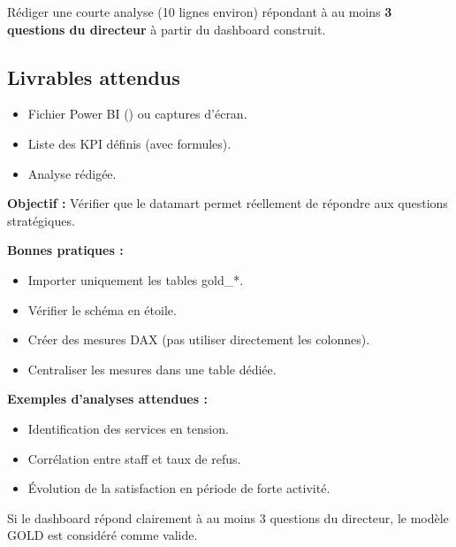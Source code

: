 \documentclass[11pt,a4paper]{article}
\begin{document}
Rédiger une courte analyse (10 lignes environ) répondant à au moins
\textbf{3 questions du directeur} à partir du dashboard construit.

\subsection*{Livrables attendus}

\begin{itemize}
  \item Fichier Power BI () ou captures d’écran.
  \item Liste des KPI définis (avec formules).
  \item Analyse rédigée.
\end{itemize}

\begin{tcolorbox}[title=\textbf{Validation décisionnelle via Power BI :}, colback=gray!5, colframe=black, boxrule=0.8pt, arc=2mm]

\textbf{Objectif :}
Vérifier que le datamart permet réellement de répondre
aux questions stratégiques.

\textbf{Bonnes pratiques :}
\begin{itemize}
\item Importer uniquement les tables gold\_*.
\item Vérifier le schéma en étoile.
\item Créer des mesures DAX (pas utiliser directement les colonnes).
\item Centraliser les mesures dans une table dédiée.
\end{itemize}

\textbf{Exemples d’analyses attendues :}
\begin{itemize}
\item Identification des services en tension.
\item Corrélation entre staff et taux de refus.
\item Évolution de la satisfaction en période de forte activité.
\end{itemize}

Si le dashboard répond clairement à au moins 3 questions du directeur,
le modèle GOLD est considéré comme valide.

\end{tcolorbox}
\end{document}
